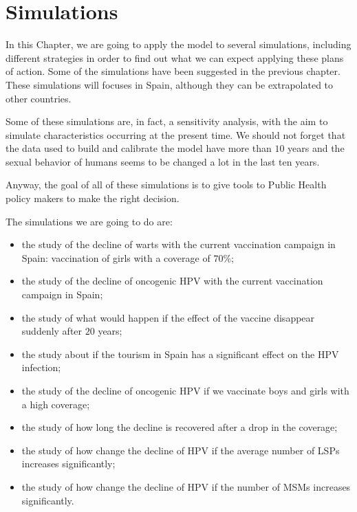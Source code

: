 \chapter{Simulations}\label{HPVSpain}
In this Chapter, we are going to apply the model to several simulations, including different strategies in order to find out what we can expect applying these plans of action. Some of the simulations have been suggested in the previous chapter. These simulations will focuses in Spain, although they can be extrapolated to other countries. 

Some of these simulations are, in fact, a sensitivity analysis, with the aim to simulate characteristics occurring at the present time. We should not forget that the data used to build and calibrate the model have more than $10$ years and the sexual behavior of humans seems to be changed a lot in the last ten years.

Anyway, the goal of all of these simulations is to give tools to Public Health policy makers to make the right decision.
 
The simulations we are going to do are:

\begin{itemize}
\item the study of the decline of warts with the current vaccination campaign in Spain: vaccination of girls with a coverage of $70\%$;
\item the study of the decline of oncogenic HPV with the current vaccination campaign in Spain;
\item the study of what would happen if the effect of the vaccine disappear suddenly after $20$ years;
\item the study about if the tourism in Spain has a significant effect on the HPV infection;
\item the study of the decline of oncogenic HPV if we vaccinate boys and girls with a high coverage;
\item the study of how long the decline is recovered after a drop in the coverage;
\item the study of how change the decline of HPV if the average number of LSPs increases significantly;
\item the study of how change the decline of HPV if the number of MSMs increases significantly.
\end{itemize}

